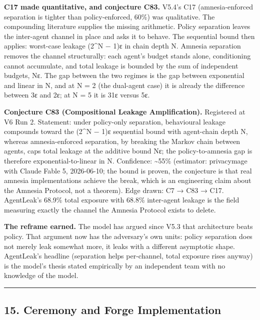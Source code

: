 \documentclass[
]{article}
\begin{document}
\textbf{C17 made quantitative, and conjecture C83.} V5.4's C17
(amnesia-enforced separation is tighter than policy-enforced, 60\%) was
qualitative. The compounding literature supplies the missing arithmetic.
Policy separation leaves the inter-agent channel in place and asks it to
behave. The sequential bound then applies: worst-case leakage (2\^{}N −
1)ε in chain depth N. Amnesia separation removes the channel
structurally: each agent's budget stands alone, conditioning cannot
accumulate, and total leakage is bounded by the sum of independent
budgets, Nε. The gap between the two regimes is the gap between
exponential and linear in N, and at N = 2 (the dual-agent case) it is
already the difference between 3ε and 2ε; at N = 5 it is 31ε versus 5ε.

\textbf{Conjecture C83 (Compositional Leakage Amplification).}
Registered at V6 Run 2. Statement: under policy-only separation,
behavioural leakage compounds toward the (2\^{}N − 1)ε sequential bound
with agent-chain depth N, whereas amnesia-enforced separation, by
breaking the Markov chain between agents, caps total leakage at the
additive bound Nε; the policy-to-amnesia gap is therefore
exponential-to-linear in N. Confidence: \textasciitilde55\% (estimator:
privacymage with Claude Fable 5, 2026-06-10; the bound is proven, the
conjecture is that real amnesia implementations achieve the break, which
is an engineering claim about the Amnesia Protocol, not a theorem). Edge
drawn: C7 → C83 → C17. AgentLeak's 68.9\% total exposure with 68.8\%
inter-agent leakage is the field measuring exactly the channel the
Amnesia Protocol exists to delete.

\textbf{The reframe earned.} The model has argued since V5.3 that
architecture beats policy. That argument now has the adversary's own
units: policy separation does not merely leak somewhat more, it leaks
with a different asymptotic shape. AgentLeak's headline (separation
helps per-channel, total exposure rises anyway) is the model's thesis
stated empirically by an independent team with no knowledge of the
model.

\begin{center}\rule{0.5\linewidth}{0.5pt}\end{center}

\subsection{15. Ceremony and Forge
Implementation}\label{ceremony-and-forge-implementation}
\end{document}

